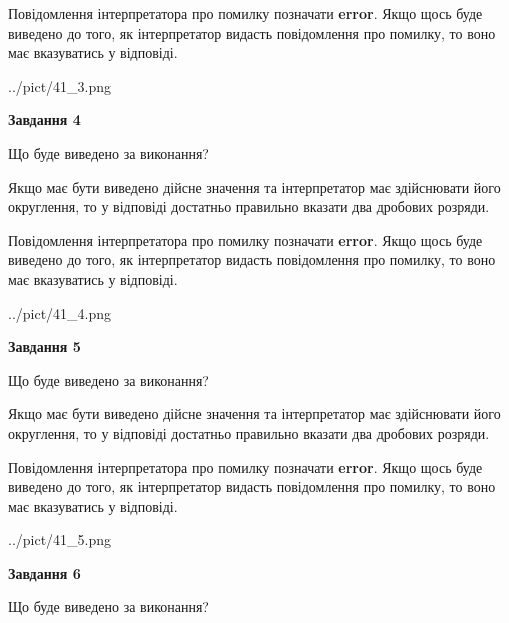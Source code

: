 \documentclass[12pt, ukrainian]{article}
\begin{document}
{\begin {Large}
Повідомлення інтерпретатора про помилку позначати \textbf{error}.
Якщо щось буде виведено до того, як інтерпретатор видасть повідомлення про помилку, 
то воно має вказуватись у відповіді. \par

\begin{center}
	{../pict/41_3.png}
\end{center}
\newpage

{\begin {center}\textbf{Завдання 4}\end {center}}\par
Що буде виведено за виконання? \par

Якщо має бути виведено дійсне значення та інтерпретатор має здійснювати його округлення, 
то у відповіді достатньо правильно вказати два дробових розряди.

Повідомлення інтерпретатора про помилку позначати \textbf{error}.
Якщо щось буде виведено до того, як інтерпретатор видасть повідомлення про помилку, 
то воно має вказуватись у відповіді. \par

\begin{center}
	{../pict/41_4.png}
\end{center}
\newpage

{\begin {center}\textbf{Завдання 5}\end {center}}\par
Що буде виведено за виконання? \par

Якщо має бути виведено дійсне значення та інтерпретатор має здійснювати його округлення, 
то у відповіді достатньо правильно вказати два дробових розряди.

Повідомлення інтерпретатора про помилку позначати \textbf{error}.
Якщо щось буде виведено до того, як інтерпретатор видасть повідомлення про помилку, 
то воно має вказуватись у відповіді. \par

\begin{center}
	{../pict/41_5.png}
\end{center}
\newpage

{\begin {center}\textbf{Завдання 6}\end {center}}\par
Що буде виведено за виконання? \par


\end{Large}}
\end{document}
